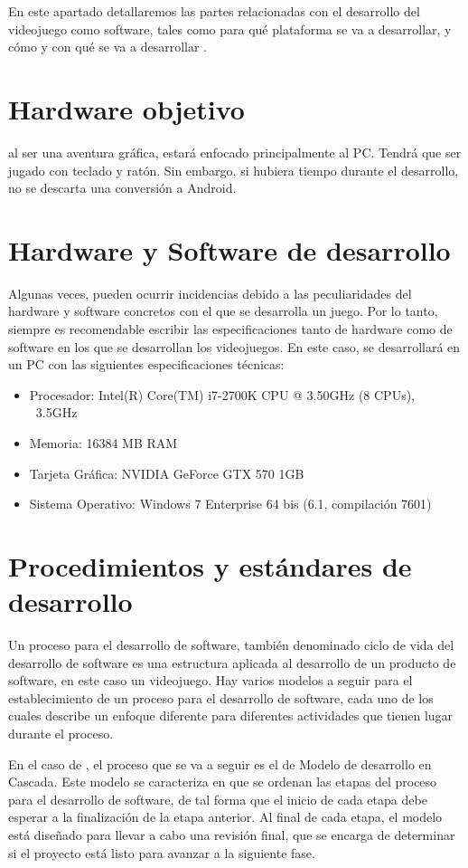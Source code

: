 En este apartado detallaremos las partes relacionadas con el desarrollo del videojuego como software, tales como para qué plataforma se va a desarrollar, y cómo y con qué se va a desarrollar \nombrejuego.

    \section{Hardware objetivo}
    \nombrejuego al ser una aventura gráfica, estará enfocado principalmente al PC. Tendrá que ser jugado con teclado y ratón. Sin embargo, si hubiera tiempo durante el desarrollo, no se descarta una conversión a Android.
    
    \section{Hardware y Software de desarrollo}
    Algunas veces, pueden ocurrir incidencias debido a las peculiaridades del hardware y software concretos con el que se desarrolla un juego. Por lo tanto, siempre es recomendable escribir las especificaciones tanto de hardware como de software en los que se desarrollan los videojuegos. En este caso, \nombrejuego se desarrollará en un PC con las siguientes especificaciones técnicas:
    
    \begin{itemize}
    \item Procesador: Intel(R) Core(TM) i7-2700K CPU @ 3.50GHz (8 CPUs), ~3.5GHz
    \item Memoria: 16384 MB RAM
    \item Tarjeta Gráfica: NVIDIA GeForce GTX 570 1GB
    \item Sistema Operativo: Windows 7 Enterprise 64 bis (6.1, compilación 7601)
    \end{itemize}
    
    \section{Procedimientos y estándares de desarrollo}
    Un proceso para el desarrollo de software, también denominado ciclo de vida del desarrollo de software es una estructura aplicada al desarrollo de un producto de software, en este caso un videojuego. Hay varios modelos a seguir para el establecimiento de un proceso para el desarrollo de software, cada uno de los cuales describe un enfoque diferente para diferentes actividades que tienen lugar durante el proceso. 
    
    En el caso de \nombrejuego, el proceso que se va a seguir es el de Modelo de desarrollo en Cascada. Este modelo se caracteriza en que se ordenan las etapas del proceso para el desarrollo de software, de tal forma que el inicio de cada etapa debe esperar a la finalización de la etapa anterior. Al final de cada etapa, el modelo está diseñado para llevar a cabo una revisión final, que se encarga de determinar si el proyecto está listo para avanzar a la siguiente fase.
    
